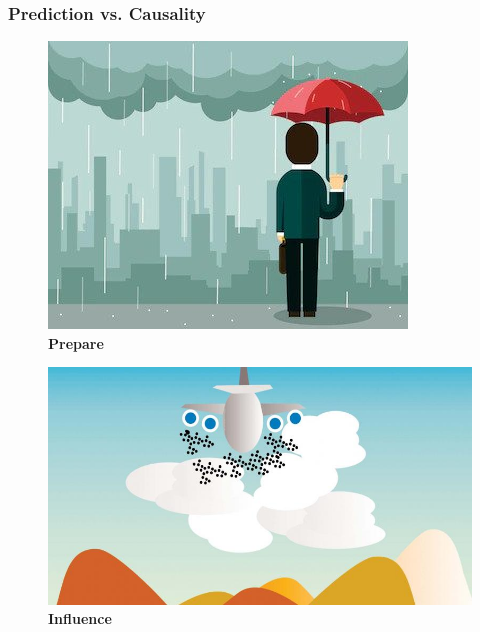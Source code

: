 \documentclass[
  shownotes,
  xcolor={svgnames},
  hyperref={colorlinks,citecolor=DarkBlue,linkcolor=andesred,urlcolor=DarkBlue}
  , aspectratio=169]{beamer}
\begin{document}
\begin{frame}
\frametitle{Prediction vs. Causality}



\begin{minipage}[t]{0.45\linewidth}
        \begin{figure}[H] \centering
            \captionsetup{justification=centering}  
            \includegraphics[scale=0.3]{figures/umbrella.jpg}
            \caption*{\bf Prepare}
    \end{figure}
    \end{minipage}
    \hfill
    \begin{minipage}[t]{0.45\linewidth}%
        \begin{figure}[H] \centering
            \captionsetup{justification=centering}  
            \includegraphics[scale=0.2]{figures/seeding.jpeg}
            \caption*{\bf Influence}
    \end{figure}
    \end{minipage}

\end{frame}
\end{document}

